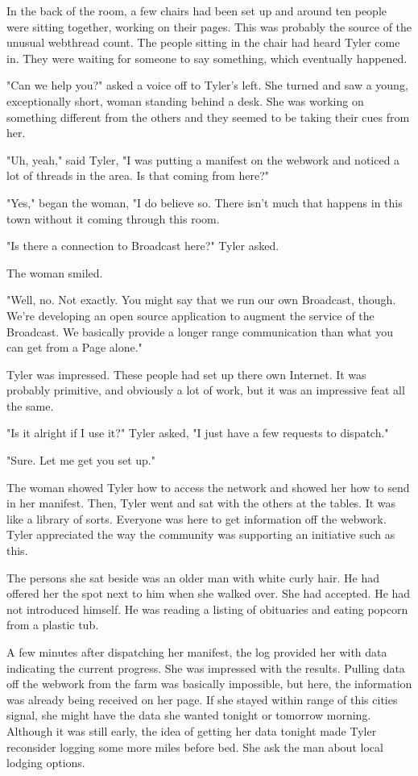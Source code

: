 \documentclass[courier]{sffms}
\begin{document}
In the back of the room, a few chairs had been set up and
around ten people were sitting together, working on their
pages. This was probably the source of the unusual webthread
count. The people sitting in the chair had heard Tyler come in.
They were waiting for someone to say something, which
eventually happened.

"Can we help you?" asked a voice off to Tyler's left. She turned
and saw a young, exceptionally short, woman standing behind
a desk. She was working on something different from the others
and they seemed to be taking their cues from her.

"Uh, yeah," said Tyler, "I was putting a manifest on the webwork
and noticed a lot of threads in the area. Is that coming from here?"

"Yes," began the woman, "I do believe so. There isn't much that
happens in this town without it coming through this room. 

"Is there a connection to Broadcast here?" Tyler asked.

The woman smiled.

"Well, no. Not exactly. You might say that we run our own
Broadcast, though. We're developing an open source application
to augment the service of the Broadcast. We basically provide a
longer range communication than what you can get from a
Page alone."

Tyler was impressed. These people had set up there own Internet.
It was probably primitive, and obviously a lot of work, but it was
an impressive feat all the same.

"Is it alright if I use it?" Tyler asked, "I just have a few requests
to dispatch."

"Sure. Let me get you set up."

The woman showed Tyler how to access the network and showed
her how to send in her manifest. Then, Tyler went and sat with
the others at the tables. It was like a library of sorts. Everyone
was here to get information off the webwork. Tyler appreciated
the way the community was supporting an initiative such as this.

The persons she sat beside was an older man with white curly
hair. He had offered her the spot next to him when she 
walked over. She had accepted. He had not introduced himself.
He was reading a listing of obituaries and eating popcorn
from a plastic tub.

A few minutes after dispatching her manifest, the log provided
her with data indicating the current progress. She was impressed
with the results. Pulling data off the webwork from the farm
was basically impossible, but here, the information was already
being received on her page. If she stayed within range of this
cities signal, she might have the data she wanted tonight or
tomorrow morning. Although it was still early, the idea of
getting her data tonight made Tyler reconsider logging some
more miles before bed. She ask the man about local
lodging options.
\end{document}
